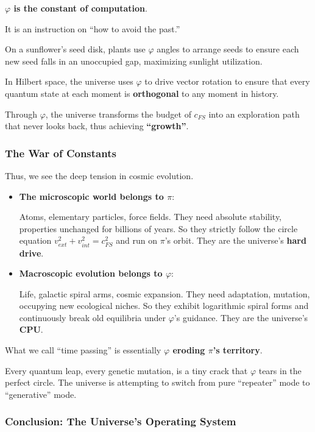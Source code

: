 \textbf{$\varphi$ is the constant of computation}.

It is an instruction on ``how to avoid the past.''

On a sunflower's seed disk, plants use $\varphi$ angles to arrange seeds to ensure each new seed falls in an unoccupied gap, maximizing sunlight utilization.

In Hilbert space, the universe uses $\varphi$ to drive vector rotation to ensure that every quantum state at each moment is \textbf{orthogonal} to any moment in history.

Through $\varphi$, the universe transforms the budget of $c_{FS}$ into an exploration path that never looks back, thus achieving \textbf{``growth''}.

\subsubsection{The War of Constants}

Thus, we see the deep tension in cosmic evolution.

\begin{itemize}
\item \textbf{The microscopic world belongs to $\pi$}:

    Atoms, elementary particles, force fields. They need absolute stability, properties unchanged for billions of years. So they strictly follow the circle equation $v_{ext}^2 + v_{int}^2 = c_{FS}^2$ and run on $\pi$'s orbit. They are the universe's \textbf{hard drive}.

\item \textbf{Macroscopic evolution belongs to $\varphi$}:

    Life, galactic spiral arms, cosmic expansion. They need adaptation, mutation, occupying new ecological niches. So they exhibit logarithmic spiral forms and continuously break old equilibria under $\varphi$'s guidance. They are the universe's \textbf{CPU}.
\end{itemize}

What we call ``time passing'' is essentially \textbf{$\varphi$ eroding $\pi$'s territory}.

Every quantum leap, every genetic mutation, is a tiny crack that $\varphi$ tears in the perfect circle. The universe is attempting to switch from pure ``repeater'' mode to ``generative'' mode.

\subsubsection{Conclusion: The Universe's Operating System}

